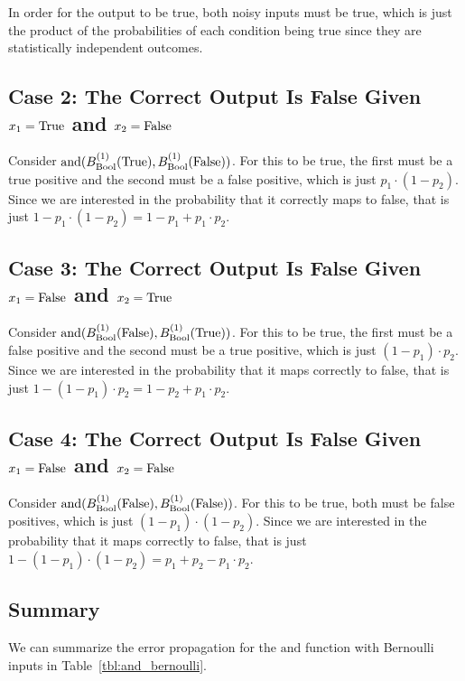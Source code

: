 \documentclass[../main.tex]{subfiles}
\begin{document}
In order for the output to be true, both noisy inputs must be true, which is just the product of the probabilities of each condition being true since they are statistically independent outcomes.

\subsection{Case 2: The Correct Output Is False Given $x_1 = \mathrm{True}$ and $x_2 = \mathrm{False}$}

Consider $\mathrm{and}(B_{\mathrm{Bool}}^{(1)}(\mathrm{True}), B_{\mathrm{Bool}}^{(1)}(\mathrm{False}))$.
For this to be true, the first must be a true positive and the second must be
a false positive, which is just $p_1 \cdot (1-p_2)$. Since we are interested in the probability that it correctly maps to false, that is just
$1 - p_1 \cdot (1-p_2) = 1 - p_1 + p_1 \cdot p_2$.

\subsection{Case 3: The Correct Output Is False Given $x_1 = \mathrm{False}$ and $x_2 = \mathrm{True}$}

Consider $\mathrm{and}(B_{\mathrm{Bool}}^{(1)}(\mathrm{False}), B_{\mathrm{Bool}}^{(1)}(\mathrm{True}))$.
For this to be true, the first must be a false positive and the second must
be a true positive, which is just $(1-p_1) \cdot p_2$. Since we are interested in the
probability that it maps correctly to false, that is just
$1 - (1-p_1) \cdot p_2 = 1 - p_2 + p_1 \cdot p_2$.

\subsection{Case 4: The Correct Output Is False Given $x_1 = \mathrm{False}$ and $x_2 = \mathrm{False}$}

Consider $\mathrm{and}(B_{\mathrm{Bool}}^{(1)}(\mathrm{False}), B_{\mathrm{Bool}}^{(1)}(\mathrm{False}))$.
For this to be true, both must be false positives, which is just
$(1-p_1) \cdot (1-p_2)$. Since we are interested in the probability that it maps correctly
to false, that is just $1 - (1-p_1) \cdot (1-p_2) = p_1 + p_2 - p_1 \cdot p_2$.

\subsection{Summary}

We can summarize the error propagation for the $\mathrm{and}$ function with Bernoulli inputs in Table~\ref{tbl:and_bernoulli}.
\end{document}

